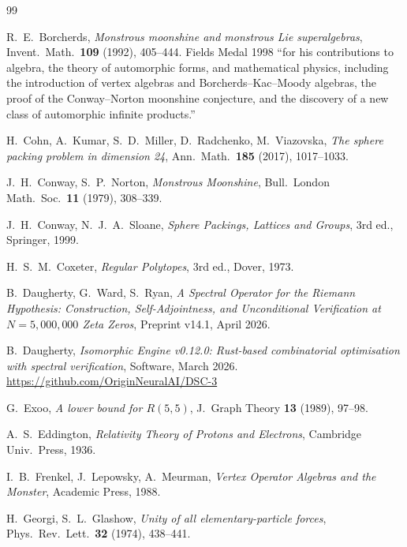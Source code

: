 \documentclass[11pt,a4paper]{article}
\theoremstyle{plain}
\theoremstyle{remark}
\begin{document}
\newpage
\begin{thebibliography}{99}

R.~E.~Borcherds,
\emph{Monstrous moonshine and monstrous Lie superalgebras},
Invent.\ Math.\ \textbf{109} (1992), 405--444.
Fields Medal 1998 ``for his contributions to algebra, the theory of
automorphic forms, and mathematical physics, including the introduction
of vertex algebras and Borcherds--Kac--Moody algebras, the proof of the
Conway--Norton moonshine conjecture, and the discovery of a new class
of automorphic infinite products.''

H.~Cohn, A.~Kumar, S.~D.~Miller, D.~Radchenko, M.~Viazovska,
\emph{The sphere packing problem in dimension 24},
Ann.\ Math.\ \textbf{185} (2017), 1017--1033.

J.~H.~Conway, S.~P.~Norton,
\emph{Monstrous Moonshine},
Bull.\ London Math.\ Soc.\ \textbf{11} (1979), 308--339.

J.~H.~Conway, N.~J.~A.~Sloane,
\emph{Sphere Packings, Lattices and Groups},
3rd ed., Springer, 1999.

H.~S.~M.~Coxeter,
\emph{Regular Polytopes},
3rd ed., Dover, 1973.

B.~Daugherty, G.~Ward, S.~Ryan,
\emph{A Spectral Operator for the Riemann Hypothesis:
Construction, Self-Adjointness, and Unconditional Verification
at $N=5{,}000{,}000$ Zeta Zeros},
Preprint v14.1, April 2026.

B.~Daugherty,
\emph{Isomorphic Engine v0.12.0: Rust-based combinatorial optimisation
with spectral verification},
Software, March 2026.
\url{https://github.com/OriginNeuralAI/DSC-3}

G.~Exoo,
\emph{A lower bound for $R(5,5)$},
J.~Graph Theory \textbf{13} (1989), 97--98.

A.~S.~Eddington,
\emph{Relativity Theory of Protons and Electrons},
Cambridge Univ.\ Press, 1936.

I.~B.~Frenkel, J.~Lepowsky, A.~Meurman,
\emph{Vertex Operator Algebras and the Monster},
Academic Press, 1988.

H.~Georgi, S.~L.~Glashow,
\emph{Unity of all elementary-particle forces},
Phys.\ Rev.\ Lett.\ \textbf{32} (1974), 438--441.


\end{thebibliography}
\end{document}
